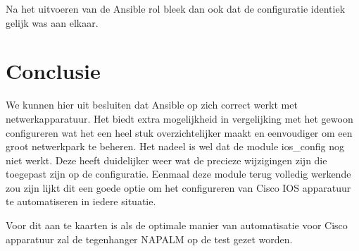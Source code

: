 Na het uitvoeren van de Ansible rol bleek dan ook dat de configuratie identiek gelijk was aan elkaar. 

\section{Conclusie}
\label{ch:ansibleconclusion}
We kunnen hier uit besluiten dat Ansible op zich correct werkt met netwerkapparatuur. Het biedt extra mogelijkheid in vergelijking met het gewoon configureren wat het een heel stuk overzichtelijker maakt en eenvoudiger om een groot netwerkpark te beheren. Het nadeel is wel dat de module ios\_config nog niet werkt. Deze heeft duidelijker weer wat de precieze wijzigingen zijn die toegepast zijn op de configuratie. Eenmaal deze module terug volledig werkende zou zijn lijkt dit een goede optie om het configureren van Cisco IOS apparatuur te automatiseren in iedere situatie.

Voor dit aan te kaarten is als de optimale manier van automatisatie voor Cisco apparatuur zal de tegenhanger NAPALM op de test gezet worden.